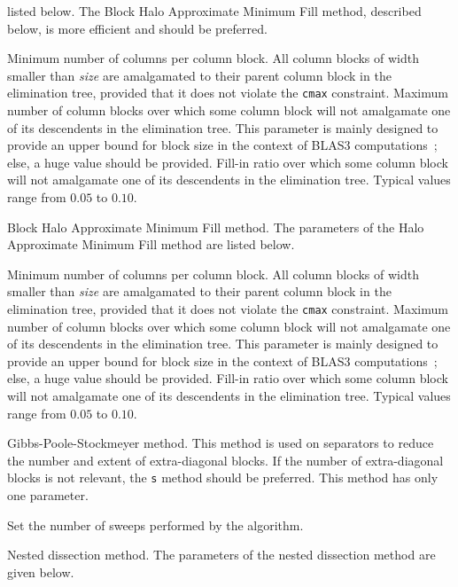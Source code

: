 \begin{itemize}
listed below. The Block Halo Approximate Minimum Fill method,
described below, is more efficient and should be preferred.
\begin{itemize}
\iteme[{\tt cmin=}{\it size}]
Minimum number of columns per column block. All column blocks
of width smaller than {\it size\/} are amalgamated to their
parent column block in the elimination tree, provided that it
does not violate the {\tt cmax} constraint.
\iteme[{\tt cmax=}{\it size}]
Maximum number of column blocks over which some column block
will not amalgamate one of its descendents in the elimination
tree. This parameter is mainly designed to provide an upper
bound for block size in the context of BLAS3 computations~;
else, a huge value should be provided.
\iteme[{\tt frat=}{\it rat}]
Fill-in ratio over which some column block will not amalgamate
one of its descendents in the elimination tree. Typical values
range from $0.05$ to $0.10$.
\end{itemize}
\iteme[{\tt f}]
Block Halo Approximate Minimum Fill method.
The parameters of the Halo Approximate Minimum Fill method are
listed below.
\begin{itemize}
\iteme[{\tt cmin=}{\it size}]
Minimum number of columns per column block. All column blocks
of width smaller than {\it size\/} are amalgamated to their
parent column block in the elimination tree, provided that it
does not violate the {\tt cmax} constraint.
\iteme[{\tt cmax=}{\it size}]
Maximum number of column blocks over which some column block
will not amalgamate one of its descendents in the elimination
tree. This parameter is mainly designed to provide an upper
bound for block size in the context of BLAS3 computations~;
else, a huge value should be provided.
\iteme[{\tt frat=}{\it rat}]
Fill-in ratio over which some column block will not amalgamate
one of its descendents in the elimination tree. Typical values
range from $0.05$ to $0.10$.
\end{itemize}
\iteme[{\tt g}]
Gibbs-Poole-Stockmeyer method. This method is used on separators
to reduce the number and extent of extra-diagonal blocks. If
the number of extra-diagonal blocks is not relevant, the {\tt s}
method should be preferred. This method has only one parameter.
\begin{itemize}
\iteme[{\tt pass=}{\it nbr}]
Set the number of sweeps performed by the algorithm.
\end{itemize}
\iteme[{\tt n}]
Nested dissection method. The parameters of the nested dissection method are
given below.
\begin{itemize}

\end{itemize}
\end{itemize}
